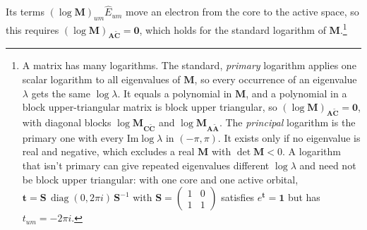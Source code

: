 \documentclass[aip,jcp,preprint]{revtex4-1}
\newcommand{\bvec}[1]{\mathbf{#1}}
\newcommand{\diag}{\operatorname{diag}}
\begin{document}
Its terms $(\log\bvec{M})_{um}\hat{E}_{um}$ move an electron from the core to the active space, so this requires $(\log\bvec{M})_{\bvec{A}\tilde{\bvec{C}}} = \bvec{0}$, which holds for the standard logarithm of $\bvec{M}$.\footnote{A matrix has many logarithms.
The standard, \emph{primary} logarithm applies one scalar logarithm to all eigenvalues of $\bvec{M}$, so every occurrence of an eigenvalue $\lambda$ gets the same $\log\lambda$.
It equals a polynomial in $\bvec{M}$, and a polynomial in a block upper-triangular matrix is block upper triangular, so $(\log\bvec{M})_{\bvec{A}\tilde{\bvec{C}}} = \bvec{0}$, with diagonal blocks $\log\bvec{M}_{\bvec{C}\tilde{\bvec{C}}}$ and $\log\bvec{M}_{\bvec{A}\tilde{\bvec{A}}}$.
The \emph{principal} logarithm is the primary one with every $\mathrm{Im}\log\lambda$ in $(-\pi, \pi)$.
It exists only if no eigenvalue is real and negative, which excludes a real $\bvec{M}$ with $\det\bvec{M} < 0$.
A logarithm that isn't primary can give repeated eigenvalues different $\log\lambda$ and need not be block upper triangular: with one core and one active orbital, $\bvec{t} = \bvec{S}\,\diag(0, 2\pi i)\,\bvec{S}^{-1}$ with $\bvec{S} = \left(\begin{smallmatrix}1 & 0\\ 1 & 1\end{smallmatrix}\right)$ satisfies $e^{\bvec{t}} = \bvec{1}$ but has $t_{um} = -2\pi i$.}
\end{document}
